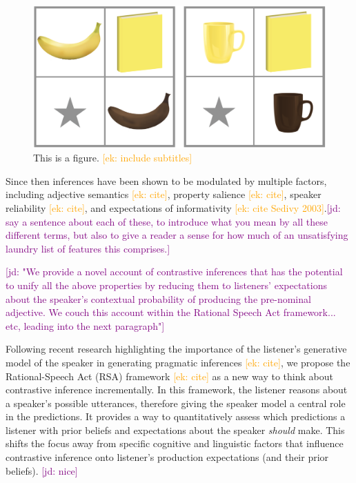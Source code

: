 \documentclass[10pt,letterpaper]{article}
\newcommand{\ek}[1]{\textcolor{Orange}{[ek: #1]}}
\newcommand{\jd}[1]{\textcolor{Purple}{[jd: #1]}}
\begin{document}
\begin{figure}
	\begin{center}
		\includegraphics[width=.475\textwidth]{graphs/Sedivy2003-contexts.pdf}
	\end{center}
\caption{This is a figure. \ek{include subtitles}} 
\label{example-context}
\end{figure}





Since then inferences have been shown to be modulated by multiple factors, including adjective semantics \ek{cite}, property salience \ek{cite}, speaker reliability \ek{cite}, and expectations of informativity \ek{cite Sedivy 2003}.\jd{say a sentence about each of these, to introduce what you mean by all these different terms, but also to give a reader a sense for how much of an unsatisfying laundry list of features this comprises.}

\jd{"We provide a novel account of contrastive inferences that has the potential to unify all the above properties by reducing them to listeners' expectations about the speaker's contextual probability of producing the pre-nominal adjective. We couch this account within the Rational Speech Act framework... etc, leading into the next paragraph"}

Following recent research highlighting the importance of the listener’s generative model of the speaker in generating pragmatic inferences \ek{cite}, we propose the Rational-Speech Act (RSA) framework \ek{cite} as a new way to think about contrastive inference incrementally. In this framework, the listener reasons about a speaker's possible utterances, therefore giving the speaker model a central role in the predictions. It provides a way to quantitatively assess which predictions a listener with prior beliefs and expectations about the speaker \textit{should} make. This shifts the focus away from specific cognitive and linguistic factors that influence contrastive inference onto listener's production expectations (and their prior beliefs). 
\jd{nice}
\end{document}
